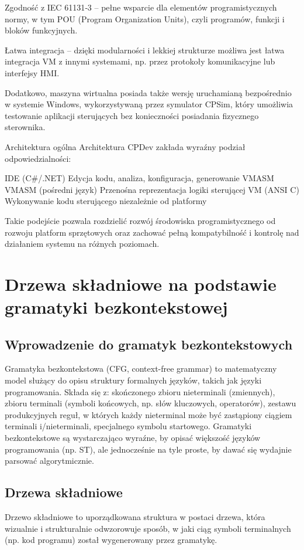 \documentclass[12pt,twoside]{article}
\begin{document}
Zgodność z IEC 61131‑3 – pełne wsparcie dla elementów programistycznych normy, w tym POU (Program Organization Units), czyli programów, funkcji i bloków funkcyjnych.

Łatwa integracja – dzięki modularności i lekkiej strukturze możliwa jest łatwa integracja VM z innymi systemami, np. przez protokoły komunikacyjne lub interfejsy HMI.

Dodatkowo, maszyna wirtualna posiada także wersję uruchamianą bezpośrednio w systemie Windows, wykorzystywaną przez symulator CPSim, który umożliwia testowanie aplikacji sterujących bez konieczności posiadania fizycznego sterownika.

Architektura ogólna
Architektura CPDev zakłada wyraźny podział odpowiedzialności:

IDE (C\#/.NET)	Edycja kodu, analiza, konfiguracja, generowanie VMASM
VMASM (pośredni język)	Przenośna reprezentacja logiki sterującej
VM (ANSI C)	Wykonywanie kodu sterującego niezależnie od platformy

Takie podejście pozwala rozdzielić rozwój środowiska programistycznego od rozwoju platform sprzętowych oraz zachować pełną kompatybilność i kontrolę nad działaniem systemu na różnych poziomach.
\clearpage

\section{Drzewa składniowe na podstawie gramatyki bezkontekstowej}
\subsection{Wprowadzenie do gramatyk bezkontekstowych}
Gramatyka bezkontekstowa (CFG, context-free grammar) to matematyczny model służący do opisu struktury formalnych języków, takich jak języki programowania. Składa się z:
skończonego zbioru nieterminali (zmiennych),
zbioru terminali (symboli końcowych, np. słów kluczowych, operatorów),
zestawu produkcyjnych reguł, w których każdy nieterminal może być zastąpiony ciągiem terminali i/nieterminali,
specjalnego symbolu startowego.
Gramatyki bezkontekstowe są wystarczająco wyraźne, by opisać większość języków programowania (np. ST), ale jednocześnie na tyle proste, by dawać się wydajnie parsować algorytmicznie.

\subsection{Drzewa składniowe}
Drzewo składniowe to uporządkowana struktura w postaci drzewa, która wizualnie i strukturalnie odwzorowuje sposób, w jaki ciąg symboli terminalnych (np. kod programu) został wygenerowany przez gramatykę.
\end{document}
